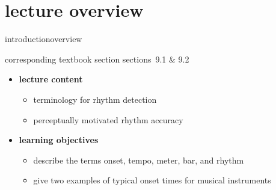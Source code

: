 


\subtitle{Module 9.1: Introduction to Tempo \& Rhythm Terminology}


	

    \section[overview]{lecture overview}
        \begin{frame}{introduction}{overview}
            \begin{block}{corresponding textbook section}
                    sections~9.1 \& 9.2
            \end{block}

            \begin{itemize}
                \item   \textbf{lecture content}
                    \begin{itemize}
                        \item   terminology for rhythm detection
                        \item   perceptually motivated rhythm accuracy
                    \end{itemize}
                \bigskip
                \item<2->   \textbf{learning objectives}
                    \begin{itemize}
                        \item   describe the terms onset, tempo, meter, bar, and rhythm
                        \item   give two examples of typical onset times for musical instruments
                    \end{itemize}
            \end{itemize}
        \end{frame}

